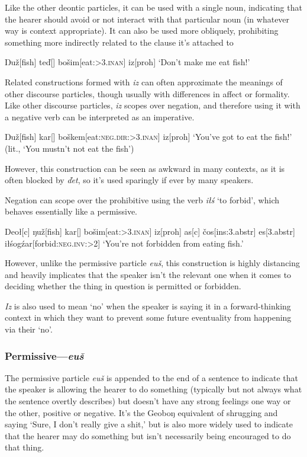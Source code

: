 \documentclass[10pt]{article}
\newcommand{\sk}{\textsc}
\newcommand{\vd}{ď}
\newcommand{\vc}{č}
\newcommand{\vz}{ž}
\newcommand{\vs}{š}
\newcommand{\Engma}{Ŋ}
\newcommand{\engma}{ŋ}
\begin{document}
Like the other deontic particles, it can be used with a single noun, indicating that the hearer should avoid or not interact with that particular noun (in whatever way is context appropriate). It can also be used more obliquely, prohibiting something more indirectly related to the clause it's attached to

\ex
\begingl
\Engma u\vz[fish]
te\vd[]
bo\vs im[eat:\sk{>3.inan}]
iz[\sc proh]
\glft `Don't make me eat fish!'
\endgl
\xe

Related constructions formed with \textit{iz} can often approximate the meanings of other discourse particles, though usually with differences in affect or formality. Like other discourse particles, \textit{iz} scopes over negation, and therefore using it with a negative verb can be interpreted as an imperative. 

\ex 
\begingl
\Engma u\vz[fish]
kar[]
bo\vs kem[eat:\sk{neg.dir:>3.inan}]
iz[\sc proh]
\glft `You've got to eat the fish!' (lit., `You mustn't not eat the fish')
\endgl
\xe

However, this construction can be seen as awkward in many contexts, as it is often blocked by \textit{\vd et}, so it's used sparingly if ever by many speakers.

Negation can scope over the prohibitive using the verb \textit{i\l\'s} `to forbid', which behaves essentially like a permissive.

\ex 
\begingl
Deo\l[\sc c]
\engma u\vz[fish]
kar[]
bo\vs im[eat:\sk{>3.inan}]
iz[\sc proh]
\nogloss{,}
as[\sc c]
\vc os[\sc ins:3.abstr]
es[\sc 3.abstr]
i\l\'sog\'zar[forbid:\sk{neg.inv:>2}]
\glft `You're not forbidden from eating fish.'
\endgl
\xe

However, unlike the permissive particle \textit{eu\vs}, this construction is highly distancing and heavily implicates that the speaker isn't the relevant one when it comes to deciding whether the thing in question is permitted or forbidden.

\textit{Iz} is also used to mean `no' when the speaker is saying it in a forward-thinking context in which they want to prevent some future eventuality from happening via their `no'.

\subsubsection{Permissive---\textit{eu\vs}} 

The permissive particle \textit{eu\vs} is appended to the end of a sentence to indicate that the speaker is allowing the hearer to do something (typically but not always what the sentence overtly describes) but doesn't have any strong feelings one way or the other, positive or negative. It's the Geobo{\engma} equivalent of shrugging and saying `Sure, I don't really give a shit,' but is also more widely used to indicate that the hearer may do something but isn't necessarily being encouraged to do that thing.
\end{document}

